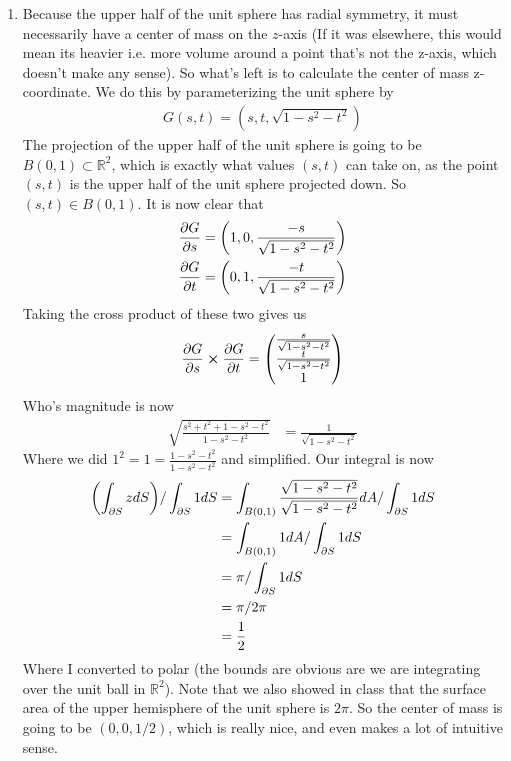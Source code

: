 \documentclass[12pt]{article}
\theoremstyle{definition}
\theoremstyle{remark}
\newcommand{\R}{\mathbb{R}}
\begin{document}
\begin{enumerate}[leftmargin=\labelsep]
		
		\item Because the upper half of the unit sphere has radial symmetry, it must necessarily have a center of mass on the $z$-axis (If it was elsewhere, this would mean its heavier i.e. more volume around a point that's not the z-axis, which doesn't make any sense). So what's left is to calculate the center of mass z-coordinate. We do this by parameterizing the unit sphere by 
		\begin{align*}
			G(s, t) = (s, t, \sqrt{1-s^2-t^2})
		\end{align*}
		The projection of the upper half of the unit sphere is going to be $B(0, 1) \subset \R^2$, which is exactly what values $(s, t)$ can take on, as the point $(s, t)$ is the upper half of the unit sphere projected down. So $(s, t) \in B(0, 1)$.
		It is now clear that 
		\begin{align*}
			\pdv{G}{s} = \qty(1, 0, \frac{-s}{\sqrt{1-s^2-t^2}}) \\
			\pdv{G}{t} = \qty(0, 1, \frac{-t}{\sqrt{1-s^2-t^2}})
		\end{align*}
		Taking the cross product of these two gives us 
		\begin{align*}
			\pdv{G}{s} \cross \pdv{G}{t} = \begin{pmatrix}
				\frac{s}{\sqrt{1-s^2-t^2}} \\
				\frac{t}{\sqrt{1-s^2-t^2}} \\
				1
			\end{pmatrix}
		\end{align*}
		Who's magnitude is now
		\begin{align*}
			\sqrt{\frac{s^2+t^2+1-s^2-t^2}{1-s^2-t^2}} &= \frac{1}{\sqrt{1-s^2-t^2}}
		\end{align*}
		Where we did $1^2 = 1 = \frac{1-s^2-t^2}{1-s^2-t^2}$ and simplified.
		Our integral is now
		\begin{align*}
			\qty(\int_{\partial S} zdS) / \int_{\partial S} 1dS &= \int_{B(0, 1)} \frac{\sqrt{1-s^2-t^2}}{\sqrt{1-s^2-t^2}}dA / \int_{\partial S} 1dS \\
			&= \int_{B(0, 1)} 1dA / \int_{\partial S} 1dS \\
			&= \pi / \int_{\partial S} 1dS \\
			&= \pi / 2\pi \\
			&= \frac12
		\end{align*}
		Where I converted to polar (the bounds are obvious are we are integrating over the unit ball in $\R^2$). Note that we also showed in class that the surface area of the upper hemisphere of the unit sphere is $2\pi$. So the center of mass is going to be $(0, 0, 1/2)$, which is really nice, and even makes a lot of intuitive sense.
		

\end{enumerate}
\end{document}
